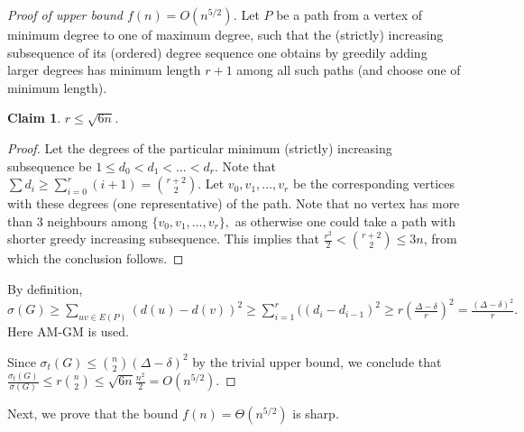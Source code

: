 \documentclass[a4paper,11pt]{article}
\newtheorem{claim}[defi]{Claim}
\newcommand*{\myproofname}{Proof}
\newenvironment{claimproof}[1][\myproofname]{\begin{proof}[#1]\renewcommand*{\qedsymbol}{\(\diamondsuit\)}}{\end{proof}}
\begin{document}
\begin{proof}[Proof of upper bound $f(n)= O(n^{5/2})$]
    Let $P$ be a path from a vertex of minimum degree to one of maximum degree, such that the (strictly) increasing subsequence of its (ordered) degree sequence one obtains by greedily adding larger degrees has minimum length $r+1$ among all such paths (and choose one of minimum length).
    
    

    \begin{claim}
        $r \le \sqrt{6n}$.
    \end{claim}

    \begin{claimproof}
        Let the degrees of the particular minimum (strictly) increasing subsequence be $1  \le d_0 < d_1< \ldots< d_{r}$.
        Note that $\sum d_i \ge \sum_{i=0}^{r} (i+1) =\binom{r+2}{2}.$
        Let $v_0, v_1, \ldots, v_r$ be the corresponding vertices with these degrees (one representative) of the path.
        Note that no vertex has more than $3$ neighbours among $\{v_0, v_1, \ldots, v_r\},$ as otherwise one could take a path with shorter greedy increasing subsequence.
        This implies that $\frac{r^2}2<\binom{r+2}{2} \le 3n$, from which the conclusion follows.
    \end{claimproof}

    By definition, $\sigma(G) \ge \sum_{uv \in E(P)} (d(u)-d(v))^2 \ge \sum_{i=1}^r ((d_i - d_{i-1})^2 \ge r \left(\frac{ \Delta- \delta}{r}\right)^2 =\frac{ (\Delta-\delta)^2}{r}.$
    Here AM-GM is used.

    Since $\sigma_t(G) \le \binom{n}{2}(\Delta-\delta)^2$ by the trivial upper bound, we conclude that 
    $\frac{\sigma_t(G)}{\sigma(G)}\le r\binom{n}{2} \le \sqrt{6n}\frac{n^2}2=O(n^{5/2}).$
\end{proof}
Next, we prove that the bound $f(n)= \Theta(n^{5/2})$ is sharp.
\end{document}
